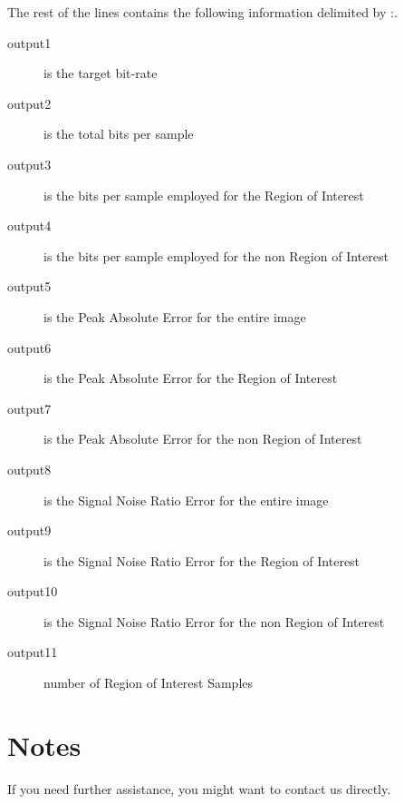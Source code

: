 \documentclass[a4paper,10pt]{article}
\begin{document}
The rest of the lines contains the following information delimited by :.

\begin{description}
\item[output1] is the target bit-rate
\item[output2] is the total bits per sample
\item[output3] is the bits per sample employed for the Region of Interest 
\item[output4] is the bits per sample employed for the non Region of Interest 
\item[output5] is the Peak Absolute Error for the entire image
\item[output6] is the Peak Absolute Error for the Region of Interest
\item[output7] is the Peak Absolute Error for the non Region of Interest
\item[output8] is the Signal Noise Ratio Error for the entire image
\item[output9] is the Signal Noise Ratio Error for the Region of Interest
\item[output10] is the Signal Noise Ratio Error for the non Region of Interest
\item[output11] number of Region of Interest Samples


\end{description}




\section{Notes}

If you need further assistance, you might want to contact us directly.



\end{document}
